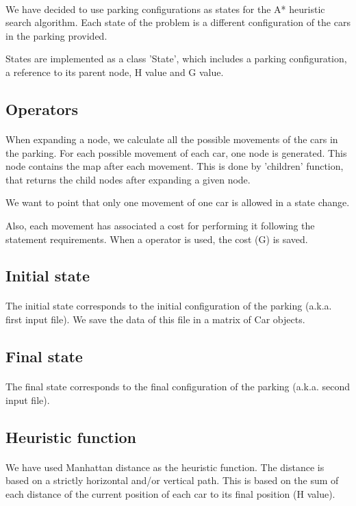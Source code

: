 \paragraph{}
We have decided to use parking configurations as states for the A* heuristic
search algorithm.
Each state of the problem is a different configuration of the cars in the parking
provided.

States are implemented as a class 'State', which includes a parking
configuration, a reference to its parent node, H value and G value.


\subsection{Operators}

\paragraph{}
When expanding a node, we calculate all the possible movements of the cars in
the parking. For each possible movement of each car, one node is generated. This
node contains the map after each movement. This is done by 'children' function,
that returns the child nodes after expanding a given node.

We want to point that only one movement of one car is allowed in a state change.

Also, each movement has associated a cost for performing it following the
statement requirements. When a operator is used, the cost (G) is saved.

\subsection{Initial state}

\paragraph{}
The initial state corresponds to the initial configuration of the parking
(a.k.a. first input file).
We save the data of this file in a matrix of Car objects.

\subsection{Final state}

\paragraph{}
The final state corresponds to the final configuration of the parking
(a.k.a. second input file).


\subsection{Heuristic function}

\paragraph{}
We have used Manhattan distance as the heuristic function. The distance is based
on a strictly horizontal and/or vertical path. This is based on the sum of each
distance of the current position of each car to its final position (H value).
